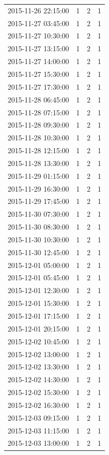 \begin{tabular}{lrrr}
2015-11-26 22:15:00 & 1 & 2 & 1 \\
2015-11-27 03:45:00 & 1 & 2 & 1 \\
2015-11-27 10:30:00 & 1 & 2 & 1 \\
2015-11-27 13:15:00 & 1 & 2 & 1 \\
2015-11-27 14:00:00 & 1 & 2 & 1 \\
2015-11-27 15:30:00 & 1 & 2 & 1 \\
2015-11-27 17:30:00 & 1 & 2 & 1 \\
2015-11-28 06:45:00 & 1 & 2 & 1 \\
2015-11-28 07:15:00 & 1 & 2 & 1 \\
2015-11-28 09:30:00 & 1 & 2 & 1 \\
2015-11-28 10:30:00 & 1 & 2 & 1 \\
2015-11-28 12:15:00 & 1 & 2 & 1 \\
2015-11-28 13:30:00 & 1 & 2 & 1 \\
2015-11-29 01:15:00 & 1 & 2 & 1 \\
2015-11-29 16:30:00 & 1 & 2 & 1 \\
2015-11-29 17:45:00 & 1 & 2 & 1 \\
2015-11-30 07:30:00 & 1 & 2 & 1 \\
2015-11-30 08:30:00 & 1 & 2 & 1 \\
2015-11-30 10:30:00 & 1 & 2 & 1 \\
2015-11-30 12:45:00 & 1 & 2 & 1 \\
2015-12-01 05:00:00 & 1 & 2 & 1 \\
2015-12-01 05:45:00 & 1 & 2 & 1 \\
2015-12-01 12:30:00 & 1 & 2 & 1 \\
2015-12-01 15:30:00 & 1 & 2 & 1 \\
2015-12-01 17:15:00 & 1 & 2 & 1 \\
2015-12-01 20:15:00 & 1 & 2 & 1 \\
2015-12-02 10:45:00 & 1 & 2 & 1 \\
2015-12-02 13:00:00 & 1 & 2 & 1 \\
2015-12-02 13:30:00 & 1 & 2 & 1 \\
2015-12-02 14:30:00 & 1 & 2 & 1 \\
2015-12-02 15:30:00 & 1 & 2 & 1 \\
2015-12-02 16:30:00 & 1 & 2 & 1 \\
2015-12-03 09:15:00 & 1 & 2 & 1 \\
2015-12-03 11:15:00 & 1 & 2 & 1 \\
2015-12-03 13:00:00 & 1 & 2 & 1 \\

\end{tabular}
